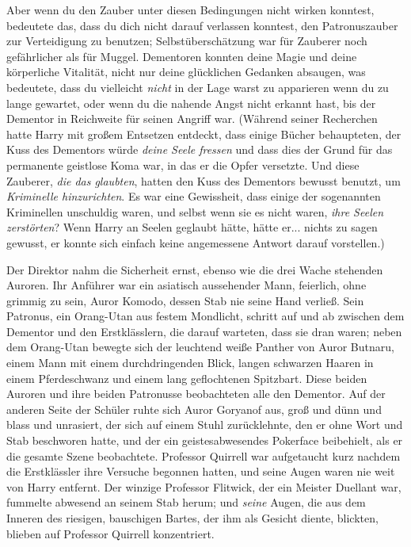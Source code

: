 {Aber wenn du den Zauber unter diesen Bedingungen nicht wirken konntest, bedeutete das, dass du dich nicht darauf verlassen konntest, den Patronuszauber zur Verteidigung zu benutzen; Selbstüberschätzung war für Zauberer noch gefährlicher als für Muggel. Dementoren konnten deine Magie und deine körperliche Vitalität, nicht nur deine glücklichen Gedanken absaugen, was bedeutete, dass du vielleicht \emph{nicht} in der Lage warst zu apparieren wenn du zu lange gewartet, oder wenn du die nahende Angst nicht erkannt hast, bis der Dementor in Reichweite für seinen Angriff war. (Während seiner Recherchen hatte Harry mit großem Entsetzen entdeckt, dass einige Bücher behaupteten, der Kuss des Dementors würde \emph{deine Seele fressen} und dass dies der Grund für das permanente geistlose Koma war, in das er die Opfer versetzte. Und diese Zauberer, \emph{die das glaubten}, hatten den Kuss des Dementors bewusst benutzt, um \emph{Kriminelle hinzurichten}. Es war eine Gewissheit, dass einige der sogenannten Kriminellen unschuldig waren, und selbst wenn sie es nicht waren, \emph{ihre Seelen zerstörten}? Wenn Harry an Seelen geglaubt hätte, hätte er... nichts zu sagen gewusst, er konnte sich einfach keine angemessene Antwort darauf vorstellen.)

Der Direktor nahm die Sicherheit ernst, ebenso wie die drei Wache stehenden Auroren. Ihr Anführer war ein asiatisch aussehender Mann, feierlich, ohne grimmig zu sein, Auror Komodo, dessen Stab nie seine Hand verließ. Sein Patronus, ein Orang-Utan aus festem Mondlicht, schritt auf und ab zwischen dem Dementor und den Erstklässlern, die darauf warteten, dass sie dran waren; neben dem Orang-Utan bewegte sich der leuchtend weiße Panther von Auror Butnaru, einem Mann mit einem durchdringenden Blick, langen schwarzen Haaren in einem Pferdeschwanz und einem lang geflochtenen Spitzbart. Diese beiden Auroren und ihre beiden Patronusse beobachteten alle den Dementor. Auf der anderen Seite der Schüler ruhte sich Auror Goryanof aus, groß und dünn und blass und unrasiert, der sich auf einem Stuhl zurücklehnte, den er ohne Wort und Stab beschworen hatte, und der ein geistesabwesendes Pokerface beibehielt, als er die gesamte Szene beobachtete. Professor Quirrell war aufgetaucht kurz nachdem die Erstklässler ihre Versuche begonnen hatten, und seine Augen waren nie weit von Harry entfernt. Der winzige Professor Flitwick, der ein Meister Duellant war, fummelte abwesend an seinem Stab herum; und \emph{seine} Augen, die aus dem Inneren des riesigen, bauschigen Bartes, der ihm als Gesicht diente, blickten, blieben auf Professor Quirrell konzentriert.

}
